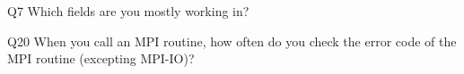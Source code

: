 \begin{description}%
\item{Q7} Which fields are you mostly working in?%
\item{Q20} When you call an MPI routine, how often do you check the error code of the MPI routine  (excepting MPI-IO)?%
\end{description}%

